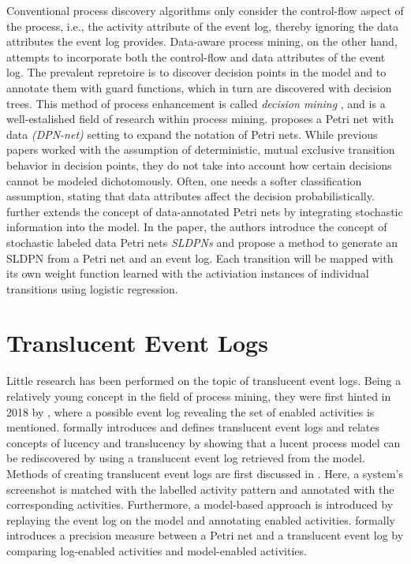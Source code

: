 Conventional process discovery algorithms only consider the control-flow aspect of the process, i.e., the activity attribute of the event log, thereby ignoring the data attributes the event log provides. Data-aware process mining, on the other hand, attempts to incorporate both the control-flow and data attributes of the event log. The prevalent repretoire is to discover decision points in the model and to annotate them with guard functions, which in turn are discovered with decision trees. This method of process enhancement is called \emph{decision mining} \cite{decision-mining-in-prom,decision-mining-in-business-processes,data-aware-process-mining}, and is a well-estalished field of research within process mining. \cite{data-aware-process-mining} proposes a Petri net with data \emph{(DPN-net)} setting to expand the notation of Petri nets. While previous papers worked with the assumption of deterministic, mutual exclusive transition behavior in decision points, they do not take into account how certain decisions cannot be modeled dichotomously. Often, one needs a softer classification assumption, stating that data attributes affect the decision probabilistically. \cite{sldpn} further extends the concept of data-annotated Petri nets by integrating stochastic information into the model. In the paper, the authors introduce the concept of stochastic labeled data Petri nets \emph{SLDPNs} and propose a method to generate an SLDPN from a Petri net and an event log. Each transition will be mapped with its own weight function learned with the activiation instances of individual transitions using logistic regression.

\section{Translucent Event Logs}

Little research has been performed on the topic of translucent event logs. Being a relatively young concept in the field of process mining, they were first hinted in 2018 by \cite{lucency-first-paper}, where a possible event log revealing the set of enabled activities is mentioned. \cite{Translucent-event-logs-first-paper} formally introduces and defines translucent event logs and relates concepts of lucency and translucency by showing that a lucent process model can be rediscovered by using a translucent event log retrieved from the model. Methods of creating translucent event logs are first discussed in \cite{creating-translucent-event-logs}. Here, a system's screenshot is matched with the labelled activity pattern and annotated with the corresponding activities. Furthermore, a model-based approach is introduced by replaying the event log on the model and annotating enabled activities. \cite{translucent-precision} formally introduces a precision measure between a Petri net and a translucent event log by comparing log-enabled activities and model-enabled activities.

